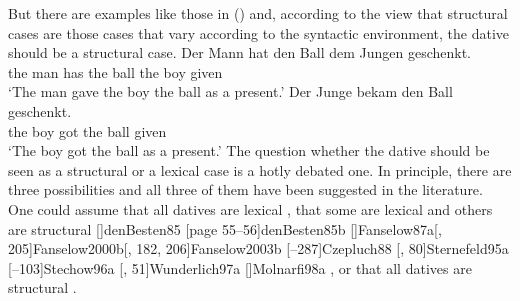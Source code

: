 But there are examples like those in () and, according to the view that structural cases are
those cases that vary according to the syntactic environment, the dative should be a structural case.
\eal
\ex 
\gll Der Mann  hat   den Ball dem Jungen geschenkt.\\
     the man   has   the ball the boy given\\
\glt `The man gave the boy the ball as a present.'
\ex 
\gll Der Junge bekam den Ball geschenkt.\\
     the boy   got   the ball given\\   
\glt `The boy got the ball as a present.'
\zl
The question whether the dative should be seen as a structural or a lexical case is a hotly debated
one. In principle, there are three possibilities and all three of them have been suggested in the
literature. One could assume that all datives are lexical 
\parencites{Haider85b}%
[]{Haider86}[, 217, 228]{HM94a}%
{Mueller99a,Mueller2001a}[]{Mueller2003e}%
[]{Scherpenisse86a}%
[, 291]{Pollard94a}%
[]{Meurers99b}[]{VS98a}[]{Abraham95a-u}%
[]{McIntyre2006a}%
{Woolford2006a},
that some are lexical and others are structural 
\parencites
{Wegener85a}%
{Wegener90}%
[]{denBesten85}%
[page 55--56]{denBesten85b}%
[]{Fanselow87a}[, 205]{Fanselow2000b}[, 182, 206]{Fanselow2003b}%
[--287]{Czepluch88}%
[, 80]{Sternefeld95a}%
[--103]{Stechow96a}%
[, 51]{Wunderlich97a}%
[]{Molnarfi98a}%
, or that all datives are structural 
\parencites[]{Sternefeld95a}%
[, 205--206]{Ryu97a}%
[--97]{Gunkel2003b}.%

